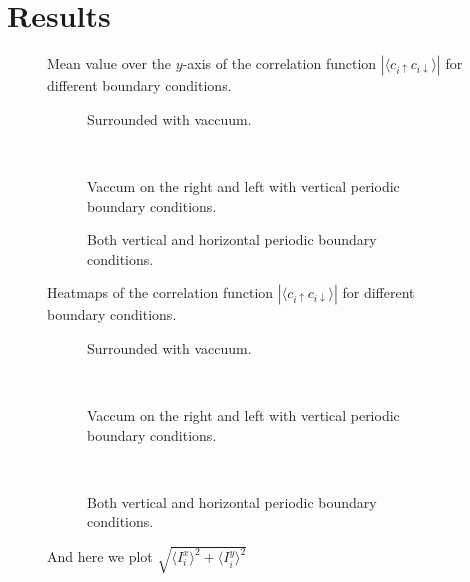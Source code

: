 \documentclass[..\main.tex]{subfile}
\begin{document}
\section{Results}
\begin{figure}[H]
    \centering
    
    \caption{Mean value over the $y$-axis of the correlation function $|\langle c_{i\uparrow} c_{i\downarrow}\rangle|$ for different boundary conditions.}
\end{figure}
   
\begin{figure}[H]
    \centering
    \begin{subfigure}{0.3\textwidth}
        \centering
        
        \caption{Surrounded with vaccuum.}
        \label{fig:first}
    \end{subfigure}\\
    \begin{subfigure}{0.45\textwidth}
        \centering
        
        \caption{Vaccum on the right and left with vertical periodic boundary conditions.}
        \label{fig:first}
    \end{subfigure}
    \begin{subfigure}{0.45\textwidth}
        \centering
        
        \caption{Both vertical and horizontal periodic boundary conditions.}
        \label{fig:first}
    \end{subfigure}
    \caption{Heatmaps of the correlation function $|\langle c_{i\uparrow} c_{i\downarrow}\rangle|$ for different boundary conditions.}
\end{figure}



\begin{figure}[H]
    \centering
    \begin{subfigure}{0.45\textwidth}
        \centering
        

        \caption{Surrounded with vaccuum.}
        \label{fig:first}
    \end{subfigure}\\
    \begin{subfigure}{0.45\textwidth}
        \centering
        
        \caption{Vaccum on the right and left with vertical periodic boundary conditions.}
        \label{fig:first}
    \end{subfigure}\\
    \begin{subfigure}{0.45\textwidth}
        \centering
        
        \caption{Both vertical and horizontal periodic boundary conditions.}
        \label{fig:first}
    \end{subfigure}
    \caption{And here we plot $\sqrt{\langle I^x_i\rangle^2 + \langle I^y_i\rangle^2}$}
\end{figure}
\end{document}

